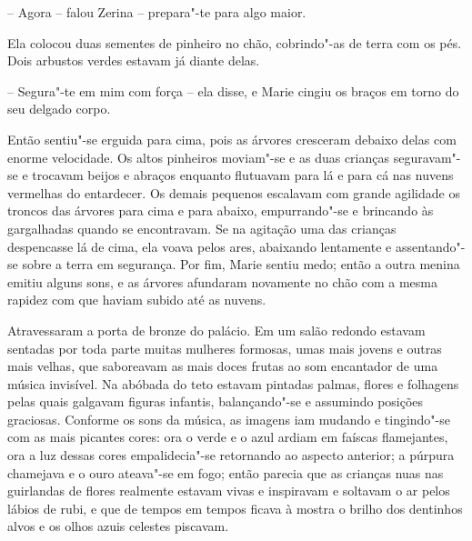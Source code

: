 -- Agora -- falou Zerina -- prepara"-te para algo maior.

Ela colocou duas sementes de pinheiro no chão, cobrindo"-as de terra com
os pés. Dois arbustos verdes estavam já diante delas.

-- Segura"-te em mim com força -- ela disse, e Marie cingiu os braços
em torno do seu delgado corpo.

Então sentiu"-se erguida para cima, pois as árvores cresceram debaixo
delas com enorme velocidade. Os altos pinheiros moviam"-se e as duas
crianças seguravam"-se e trocavam beijos e abraços enquanto flutuavam
para lá e para cá nas nuvens vermelhas do entardecer. Os demais
pequenos escalavam com grande \mbox{agilidade} os troncos das árvores para
cima e para abaixo, empurrando"-se e brincando às gargalhadas quando se
encontravam. Se na agitação uma das crianças despencasse lá de cima,
ela voava pelos ares, abaixando lentamente e assentando"-se sobre a
terra em segurança. Por fim, Marie sentiu medo; então a outra menina
emitiu alguns sons, e as árvores afundaram novamente no chão com a
mesma rapidez com que haviam subido até as nuvens.

Atravessaram a porta de bronze do palácio. Em um salão redondo estavam
sentadas por toda parte muitas mulheres formosas, umas mais jovens e
outras mais velhas, que saboreavam as mais doces frutas ao som
encantador de uma música invisível. Na abóbada do teto estavam pintadas
palmas, flores e folhagens pelas quais galgavam figuras infantis,
balançando"-se e assumindo posições graciosas. Conforme os sons da
música, as imagens iam mudando e tingindo"-se com as mais picantes 
cores: ora o verde e o azul ardiam em faíscas flamejantes, ora a luz
dessas cores empalidecia"-se retornando ao aspecto anterior; a púrpura
chamejava e o ouro ateava"-se em fogo; então parecia que as crianças
nuas nas guirlandas de flores realmente estavam vivas e inspiravam e
soltavam o ar pelos lábios de rubi, e que de tempos em tempos ficava à
mostra o brilho dos dentinhos alvos e os olhos azuis celestes piscavam.

